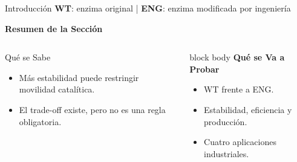 \begin{frame}{Introducción \hfill{\tiny\color{TextoSuave}\textbf{WT}: enzima original \quad | \quad \textbf{ENG}: enzima modificada por ingeniería}}



{\color{Cian}\bfseries Resumen de la Sección}\par
\vspace{0.08cm}

\begin{columns}[T,onlytextwidth]
\begin{block}{Qué se Sabe}
\small
\begin{itemize}[<+->]
\item Más estabilidad puede restringir movilidad catalítica.
\item El trade-off existe, pero no es una regla obligatoria.
\end{itemize}
\end{block}

\begin{beamercolorbox}[wd=\linewidth,sep=0.13cm,rounded=true]{block body}
\small
\textbf{Qué se Va a Probar}
\begin{itemize}
\item WT frente a ENG.
\item Estabilidad, eficiencia y producción.
\item Cuatro aplicaciones industriales.
\end{itemize}
\end{beamercolorbox}
\end{columns}

\vspace{0.10cm}

\vfill
{}
\end{frame}
